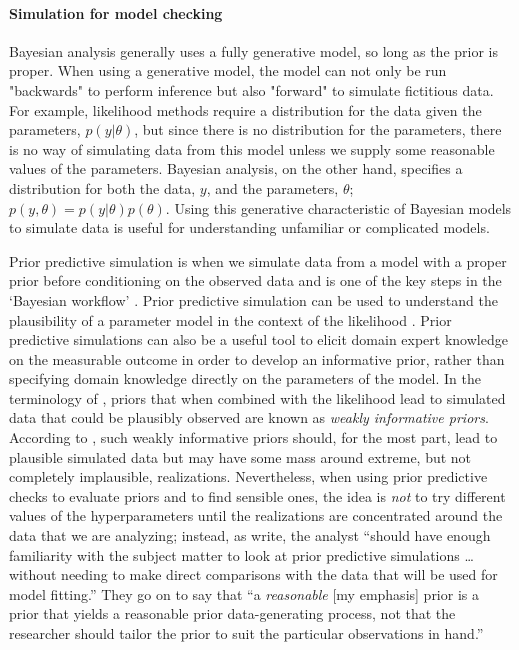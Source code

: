 \paragraph*{Simulation for model checking}

Bayesian analysis generally uses a fully generative model, so long as the prior is proper. When using a generative model, the model can not only be run "backwards" to perform inference but also "forward" to simulate fictitious data. For example, likelihood methods require a distribution for the data given the parameters, $p(y|\theta)$, but since there is no distribution for the parameters, there is no way of simulating data from this model unless we supply some reasonable values of the parameters. Bayesian analysis, on the other hand, specifies a distribution for both the data, $y$, and the parameters, $\theta$; $p(y, \theta) = p(y|\theta)p(\theta)$. Using this generative characteristic of Bayesian models to simulate data is useful for understanding unfamiliar or complicated models.

Prior predictive simulation is when we simulate data from a model with a proper prior before conditioning on the observed data and is one of the key steps in the `Bayesian workflow' \citep[Figure ~1]{gelman_workflow_2020}. Prior predictive simulation can be used to understand the plausibility of a parameter model in the context of the likelihood \citep{gelman_2017}. Prior predictive simulations can also be a useful tool to elicit domain expert knowledge on the measurable outcome in order to develop an informative prior, rather than specifying domain knowledge directly on the parameters of the model. In the terminology of \cite{gabry_vis_2019}, priors that when combined with the likelihood lead to simulated data that could be plausibly observed are known as \textit{weakly informative priors}. According to \cite{gabry_vis_2019}, such weakly informative priors should, for the most part, lead to plausible simulated data but may have some mass around extreme, but not completely implausible, realizations. Nevertheless, when using prior predictive checks to evaluate priors and to find sensible ones, the idea is \textit{not} to try different values of the hyperparameters until the realizations are concentrated around the data that we are analyzing; instead, as \cite{gabry_vis_2019a} write, the analyst ``should have enough familiarity with the subject matter to look at prior predictive simulations \ldots without needing to make direct comparisons with the data that will be used for model fitting.'' They go on to say that ``a \textit{reasonable} [my emphasis] prior is a prior that yields a reasonable prior data-generating process, not that the researcher should tailor the prior to suit the particular observations in hand.''

